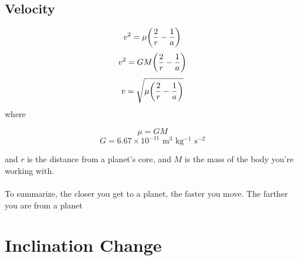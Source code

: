 \documentclass[12pt,a4paper]{article}
\numberwithin{equation}{section}
\begin{document}
\subsection{Velocity}

\begin{equation}
	v^2 = \mu \bigg{(}\frac{2}{r} - \frac{1}{a} \bigg{)}
\end{equation}
\begin{equation}
	v^2 = GM \bigg{(}\frac{2}{r} - \frac{1}{a} \bigg{)}
\end{equation}
\begin{equation}
	v = \sqrt{\mu \bigg{(}\frac{2}{r} - \frac{1}{a} \bigg{)}}
\end{equation}
where

\[ \mu = GM \]
\[ G = 6.67 \times 10^{-11} \text{ m$^{3}$ kg$^{-1}$ s$^{-2}$}\]

and $r$ is the distance from a planet's core, and $M$ is the mass of the body you're working with.\\\\

To summarize, the closer you get to a planet, the faster you move. The farther you are from a planet

\newpage

\section{Inclination Change}
\end{document}
